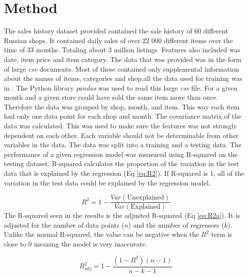 \section{Method}

The sales history dataset provided contained the sale history of 60 different Russian shops. It contained daily sales of over 22 000 different items over the time of 33 months. Totaling about 3 million listings. Features also included was date, item price and item category.
\newline
The data that was provided was in the form of large \emph{csv} documents. Most of these contained only supplemental information about the names of items, categories and shop.all the data used for training was in . The Python library \emph{pandas} was used to read this large \emph{csv} file.
\newline
For a given month and a given store could have sold the same item more than once. Therefore the data was grouped by shop, month, and item. This way each item had only one data point for each shop and month.
\newline
The covariance matrix of the data was calculated. This was used to make sure the features was not strongly dependent on each other. Each variable should not be determinable from other variables in the data.
\newline
The data was split into a training and a testing data.
\newline
The performance of a given regression model was measured using R-squared on the testing dataset. R-squared calculates the proportion of the variation in the test data that is explained by the regression (Eq \ref{eq:R2}). If R-squared is 1, all of the variation in the test data could be explained by the regression model.

\begin{equation}
    R^2 = 1-\frac{Var(\text{Unexplained})}{Var(\text{Explained})}
    \label{eq:R2}
\end{equation}
\newline
The R-squared seen in the results is the adjusted R-squared (Eq \ref{eq:R2a}). It is adjusted for the number of data points ($n$) and the number of regressors ($k$). Unlike the normal R-squared, the value can be negative when the $R^2$ term is close to 0 meaning the model is very inaccurate.

\begin{equation}
R_{a d j}^{2}=1-\frac{\left(1-R^{2}\right)(n-1)}{n-k-1}
\label{eq:R2a}
\end{equation}





